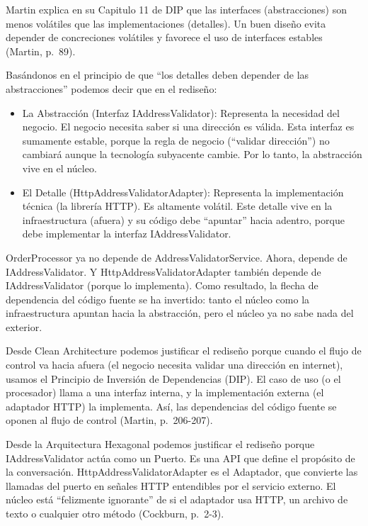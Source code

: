 \documentclass[12pt,a4paper]{article}
\begin{document}
Martin explica en su Capitulo 11 de DIP que las interfaces (abstracciones) son menos volátiles que las implementaciones (detalles). Un buen diseño evita depender de concreciones volátiles y favorece el uso de interfaces estables (Martin, p.~89).

Basándonos en el principio de que ``los detalles deben depender de las abstracciones'' podemos decir que en el rediseño:

\begin{itemize}[label=$\cdot$]
  \item La Abstracción (Interfaz IAddressValidator): Representa la necesidad del negocio. El negocio necesita saber si una dirección es válida. Esta interfaz es sumamente estable, porque la regla de negocio (``validar dirección'') no cambiará aunque la tecnología subyacente cambie. Por lo tanto, la abstracción vive en el núcleo.
  \item El Detalle (HttpAddressValidatorAdapter): Representa la implementación técnica (la librería HTTP). Es altamente volátil. Este detalle vive en la infraestructura (afuera) y su código debe ``apuntar'' hacia adentro, porque debe implementar la interfaz IAddressValidator.
\end{itemize}

OrderProcessor ya no depende de AddressValidatorService. Ahora, depende de IAddressValidator. Y HttpAddressValidatorAdapter también depende de IAddressValidator (porque lo implementa). Como resultado, la flecha de dependencia del código fuente se ha invertido: tanto el núcleo como la infraestructura apuntan hacia la abstracción, pero el núcleo ya no sabe nada del exterior.

Desde Clean Architecture podemos justificar el rediseño porque cuando el flujo de control va hacia afuera (el negocio necesita validar una dirección en internet), usamos el Principio de Inversión de Dependencias (DIP). El caso de uso (o el procesador) llama a una interfaz interna, y la implementación externa (el adaptador HTTP) la implementa. Así, las dependencias del código fuente se oponen al flujo de control (Martin, p.~206-207).

Desde la Arquitectura Hexagonal podemos justificar el rediseño porque IAddressValidator actúa como un Puerto. Es una API que define el propósito de la conversación. HttpAddressValidatorAdapter es el Adaptador, que convierte las llamadas del puerto en señales HTTP entendibles por el servicio externo. El núcleo está ``felizmente ignorante'' de si el adaptador usa HTTP, un archivo de texto o cualquier otro método (Cockburn, p.~2-3).
\end{document}
